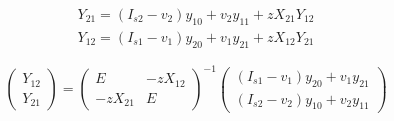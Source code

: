 \documentclass[a4paper,article,14pt]{extarticle}
\begin{document}
\begin{equation}
\begin{aligned}
    Y_{21} = (I_{s2} - v_{2}) y_{10} + v_{2} y_{11} + z X_{21} Y_{12} \\
    Y_{12} = (I_{s1} - v_{1}) y_{20} + v_{1} y_{21} + z X_{12} Y_{21}
\end{aligned}
\end{equation}

\begin{equation}
    \begin{pmatrix} Y_{12}\\ Y_{21} \end{pmatrix}
    = \begin{pmatrix}
        E & -z X_{12} \\
        -z X_{21} & E
    \end{pmatrix}^{-1}
    \begin{pmatrix}
        (I_{s1} - v_{1}) y_{20} + v_{1} y_{21} \\
        (I_{s2} - v_{2}) y_{10} + v_{2} y_{11}
    \end{pmatrix}
\end{equation}
\end{document}
